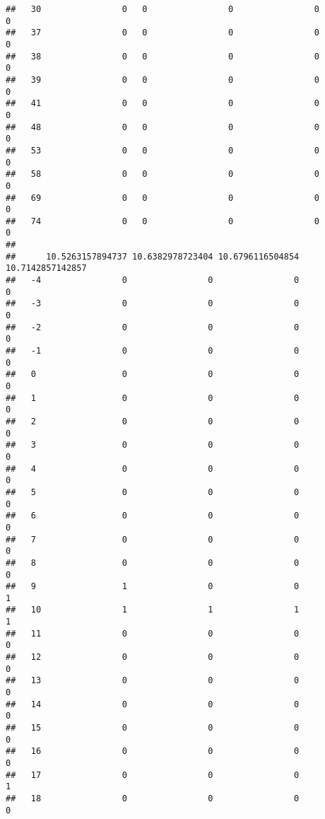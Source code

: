 \documentclass[]{article}
\begin{document}
\begin{verbatim}
##   30                0   0                0                0                0
##   37                0   0                0                0                0
##   38                0   0                0                0                0
##   39                0   0                0                0                0
##   41                0   0                0                0                0
##   48                0   0                0                0                0
##   53                0   0                0                0                0
##   58                0   0                0                0                0
##   69                0   0                0                0                0
##   74                0   0                0                0                0
##     
##      10.5263157894737 10.6382978723404 10.6796116504854 10.7142857142857
##   -4                0                0                0                0
##   -3                0                0                0                0
##   -2                0                0                0                0
##   -1                0                0                0                0
##   0                 0                0                0                0
##   1                 0                0                0                0
##   2                 0                0                0                0
##   3                 0                0                0                0
##   4                 0                0                0                0
##   5                 0                0                0                0
##   6                 0                0                0                0
##   7                 0                0                0                0
##   8                 0                0                0                0
##   9                 1                0                0                1
##   10                1                1                1                1
##   11                0                0                0                0
##   12                0                0                0                0
##   13                0                0                0                0
##   14                0                0                0                0
##   15                0                0                0                0
##   16                0                0                0                0
##   17                0                0                0                1
##   18                0                0                0                0

\end{verbatim}
\end{document}
